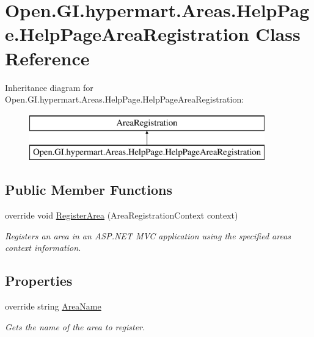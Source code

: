 \hypertarget{class_open_1_1_g_i_1_1hypermart_1_1_areas_1_1_help_page_1_1_help_page_area_registration}{}\section{Open.\+G\+I.\+hypermart.\+Areas.\+Help\+Page.\+Help\+Page\+Area\+Registration Class Reference}
\label{class_open_1_1_g_i_1_1hypermart_1_1_areas_1_1_help_page_1_1_help_page_area_registration}


 


Inheritance diagram for Open.\+G\+I.\+hypermart.\+Areas.\+Help\+Page.\+Help\+Page\+Area\+Registration\+:\begin{figure}[H]
\begin{center}
\leavevmode
\includegraphics[height=2.000000cm]{class_open_1_1_g_i_1_1hypermart_1_1_areas_1_1_help_page_1_1_help_page_area_registration}
\end{center}
\end{figure}
\subsection*{Public Member Functions}
\begin{DoxyCompactItemize}
\item 
override void \hyperlink{class_open_1_1_g_i_1_1hypermart_1_1_areas_1_1_help_page_1_1_help_page_area_registration_aee73751274402f096ce32ee010ef1a11}{Register\+Area} (Area\+Registration\+Context context)
\begin{DoxyCompactList}\small\item\em Registers an area in an A\+S\+P.\+N\+E\+T M\+V\+C application using the specified area\textquotesingle{}s context information. \end{DoxyCompactList}\end{DoxyCompactItemize}
\subsection*{Properties}
\begin{DoxyCompactItemize}
\item 
override string \hyperlink{class_open_1_1_g_i_1_1hypermart_1_1_areas_1_1_help_page_1_1_help_page_area_registration_a98b4d777a4852021b9a120b1eb5cd08a}{Area\+Name}
\begin{DoxyCompactList}\small\item\em Gets the name of the area to register. \end{DoxyCompactList}\end{DoxyCompactItemize}


